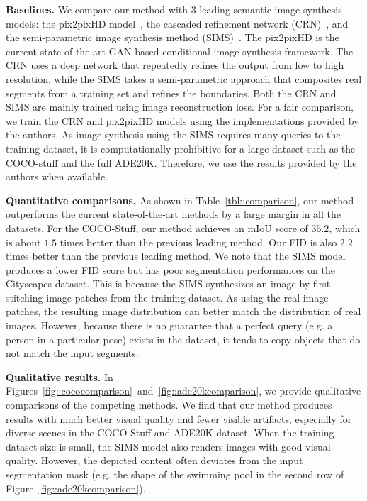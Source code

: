 {\bf Baselines.} We compare our method with 3 leading semantic image synthesis models: the pix2pixHD model~\cite{wang2018pix2pixHD}, the cascaded refinement network (CRN)~\cite{chen2017photographic}, and the semi-parametric image synthesis method (SIMS)~\cite{qi2018semi}. The pix2pixHD is the current state-of-the-art GAN-based conditional image synthesis framework. The CRN uses a deep network that repeatedly refines the output from low to high resolution, while the SIMS takes a semi-parametric approach that composites real segments from a training set and refines the boundaries. Both the CRN and SIMS are mainly trained using image reconstruction loss. For a fair comparison, we train the CRN and pix2pixHD models using the implementations provided by the authors. As image synthesis using the SIMS requires many queries to the training dataset, it is computationally prohibitive for a large dataset such as the COCO-stuff and the full ADE20K. Therefore, we use the results provided by the authors when available.

{\bf Quantitative comparisons.} As shown in Table~\ref{tbl::comparison}, our method outperforms the current state-of-the-art methods by a large margin in all the datasets. For the COCO-Stuff, our method achieves an mIoU score of $35.2$, which is about $1.5$ times better than the previous leading method. Our FID is also $2.2$ times better than the previous leading method. We note that the SIMS model produces a lower FID score but has poor segmentation performances on the Cityscapes dataset. This is because the SIMS synthesizes an image by first stitching image patches from the training dataset. As using the real image patches, the resulting image distribution can better match the distribution of real images. However, because there is no guarantee that a perfect query (e.g. a person in a particular pose) exists in the dataset, it tends to copy objects that do not match the input segments.

{\bf Qualitative results.} In Figures~\ref{fig::cococomparison}~and~\ref{fig::ade20kcomparison}, we provide qualitative comparisons of the competing methods. We find that our method produces results with much better visual quality and fewer visible artifacts, especially for diverse scenes in the COCO-Stuff and ADE20K dataset. When the training dataset size is small, the SIMS model also renders images with good visual quality. However, the depicted content often deviates from the input segmentation mask (e.g. the shape of the swimming pool in the second row of Figure~\ref{fig::ade20kcomparison}). 

